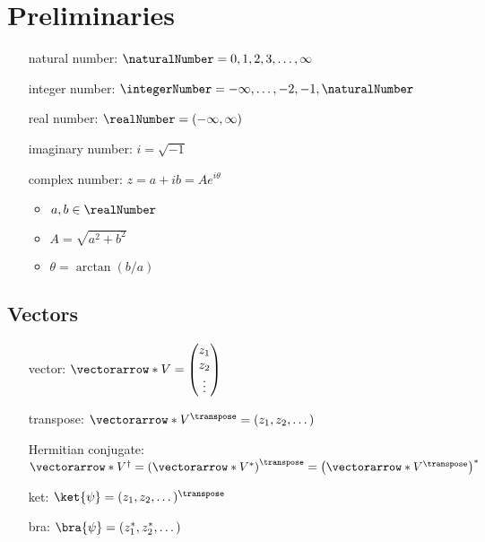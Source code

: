 \section*{Preliminaries}
\begin{itemize}
  \item [natural number:] $\naturalNumber = 0, 1, 2, 3, \dotsc, \infty$
  \item [integer number:] $\integerNumber = -\infty, \dotsc, -2, -1,
    \naturalNumber$
  \item [real number:] $\realNumber = (-\infty, \infty) $
  \item [imaginary number:] $i = \sqrt{-1}$
  \item [complex number:] $z = a + ib = Ae^{i\theta}$
    \begin{itemize}
    \item $a, b \in \realNumber$
    \item $A = \sqrt{a^2 + b^2}$
    \item $\theta = \arctan(b/a)$
    \end{itemize}
\end{itemize}

\subsection*{Vectors}
\begin{itemize}
  \item [vector:] $\vectorarrow*{V}=\begin{pmatrix}z_1\\z_2\\ \vdots \end{pmatrix}$
  \item [transpose:] $\vectorarrow*{V}^\transpose=(z_1, z_2,
    \dotsc)$
  \item [Hermitian conjugate:] $\vectorarrow*{V}^\dagger =
    \left(\vectorarrow*{V}^*\right)^\transpose = \left(\vectorarrow*{V}^\transpose\right)^*$
  \item [ket:] $\ket{\psi} = (z_1, z_2, \dotsc)^\transpose$
  \item [bra:] $\bra{\psi} = (z^*_1, z^*_2, \dotsc)$
\end{itemize}